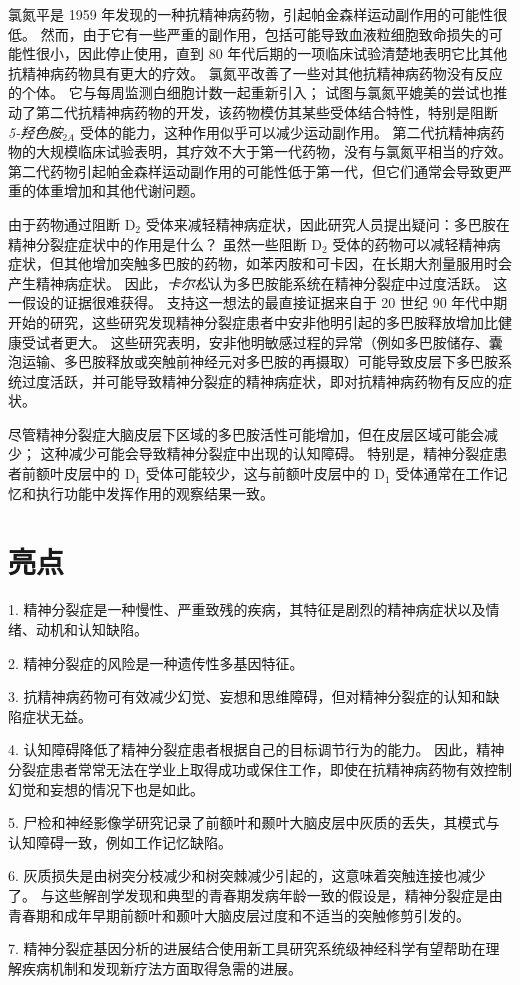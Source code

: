 氯氮平是 1959 年发现的一种抗精神病药物，引起帕金森样运动副作用的可能性很低。
然而，由于它有一些严重的副作用，包括可能导致血液粒细胞致命损失的可能性很小，因此停止使用，直到 80 年代后期的一项临床试验清楚地表明它比其他抗精神病药物具有更大的疗效。
氯氮平改善了一些对其他抗精神病药物没有反应的个体。
它与每周监测白细胞计数一起重新引入；
试图与氯氮平媲美的尝试也推动了第二代抗精神病药物的开发，该药物模仿其某些受体结合特性，特别是阻断 \textit{5-羟色胺}$_{2A}$ 受体的能力，这种作用似乎可以减少运动副作用。
第二代抗精神病药物的大规模临床试验表明，其疗效不大于第一代药物，没有与氯氮平相当的疗效。
第二代药物引起帕金森样运动副作用的可能性低于第一代，但它们通常会导致更严重的体重增加和其他代谢问题。


由于药物通过阻断 D$_2$ 受体来减轻精神病症状，因此研究人员提出疑问：多巴胺在精神分裂症症状中的作用是什么？
虽然一些阻断 D$_2$ 受体的药物可以减轻精神病症状，但其他增加突触多巴胺的药物，如苯丙胺和可卡因，在长期大剂量服用时会产生精神病症状。
因此，\textit{卡尔松}认为多巴胺能系统在精神分裂症中过度活跃。
这一假设的证据很难获得。
支持这一想法的最直接证据来自于 20 世纪 90 年代中期开始的研究，这些研究发现精神分裂症患者中安非他明引起的多巴胺释放增加比健康受试者更大。
这些研究表明，安非他明敏感过程的异常（例如多巴胺储存、囊泡运输、多巴胺释放或突触前神经元对多巴胺的再摄取）可能导致皮层下多巴胺系统过度活跃，并可能导致精神分裂症的精神病症状，即对抗精神病药物有反应的症状。


尽管精神分裂症大脑皮层下区域的多巴胺活性可能增加，但在皮层区域可能会减少；
这种减少可能会导致精神分裂症中出现的认知障碍。
特别是，精神分裂症患者前额叶皮层中的 D$_1$ 受体可能较少，这与前额叶皮层中的 D$_1$ 受体通常在工作记忆和执行功能中发挥作用的观察结果一致。



\section{亮点}

1. 精神分裂症是一种慢性、严重致残的疾病，其特征是剧烈的精神病症状以及情绪、动机和认知缺陷。


2. 精神分裂症的风险是一种遗传性多基因特征。


3. 抗精神病药物可有效减少幻觉、妄想和思维障碍，但对精神分裂症的认知和缺陷症状无益。


4. 认知障碍降低了精神分裂症患者根据自己的目标调节行为的能力。
因此，精神分裂症患者常常无法在学业上取得成功或保住工作，即使在抗精神病药物有效控制幻觉和妄想的情况下也是如此。


5. 尸检和神经影像学研究记录了前额叶和颞叶大脑皮层中灰质的丢失，其模式与认知障碍一致，例如工作记忆缺陷。


6. 灰质损失是由树突分枝减少和树突棘减少引起的，这意味着突触连接也减少了。
与这些解剖学发现和典型的青春期发病年龄一致的假设是，精神分裂症是由青春期和成年早期前额叶和颞叶大脑皮层过度和不适当的突触修剪引发的。


7. 精神分裂症基因分析的进展结合使用新工具研究系统级神经科学有望帮助在理解疾病机制和发现新疗法方面取得急需的进展。



